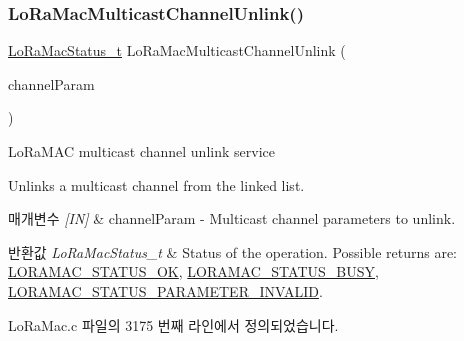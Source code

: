 \subsubsection{\texorpdfstring{Lo\+Ra\+Mac\+Multicast\+Channel\+Unlink()}{LoRaMacMulticastChannelUnlink()}}
{\footnotesize\ttfamily \mbox{\hyperlink{group___l_o_r_a_m_a_c_ga30bd25657e10480f8605ee951b0ecfbd}{Lo\+Ra\+Mac\+Status\+\_\+t}} Lo\+Ra\+Mac\+Multicast\+Channel\+Unlink (\begin{DoxyParamCaption}\item[{\mbox{\hyperlink{group___l_o_r_a_m_a_c_ga02d2523505cac70954c043074087ea65}{Multicast\+Params\+\_\+t}} $\ast$}]{channel\+Param }\end{DoxyParamCaption})}



Lo\+Ra\+M\+AC multicast channel unlink service 

Unlinks a multicast channel from the linked list.


\begin{DoxyParams}{매개변수}
{\em \mbox{[}\+I\+N\mbox{]}} & channel\+Param -\/ Multicast channel parameters to unlink.\\
\hline
\end{DoxyParams}

\begin{DoxyRetVals}{반환값}
{\em Lo\+Ra\+Mac\+Status\+\_\+t} & Status of the operation. Possible returns are\+: \mbox{\hyperlink{group___l_o_r_a_m_a_c_gga1d18f26b344040b3ec5c3db662919661a03db5fca052313edb3823c014b653a74}{L\+O\+R\+A\+M\+A\+C\+\_\+\+S\+T\+A\+T\+U\+S\+\_\+\+OK}}, \mbox{\hyperlink{group___l_o_r_a_m_a_c_gga1d18f26b344040b3ec5c3db662919661a66b12f569207eacd97ee1c1d6c4cee6d}{L\+O\+R\+A\+M\+A\+C\+\_\+\+S\+T\+A\+T\+U\+S\+\_\+\+B\+U\+SY}}, \mbox{\hyperlink{group___l_o_r_a_m_a_c_gga1d18f26b344040b3ec5c3db662919661ad0d3119f247d00e1787dda106fcb3017}{L\+O\+R\+A\+M\+A\+C\+\_\+\+S\+T\+A\+T\+U\+S\+\_\+\+P\+A\+R\+A\+M\+E\+T\+E\+R\+\_\+\+I\+N\+V\+A\+L\+ID}}. \\
\hline
\end{DoxyRetVals}


Lo\+Ra\+Mac.\+c 파일의 3175 번째 라인에서 정의되었습니다.


